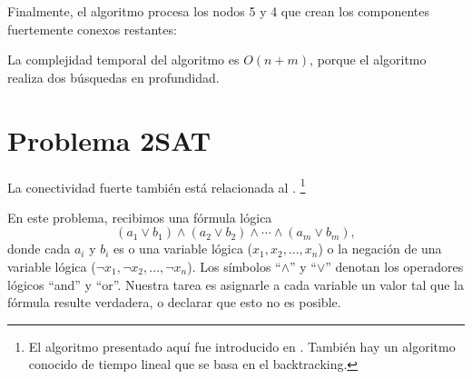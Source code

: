 Finalmente, el algoritmo procesa los nodos 5 y 4 que crean los
componentes fuertemente conexos restantes:
\begin{center}
\end{center}
La complejidad temporal del algoritmo es $O(n+m)$, porque el algoritmo
realiza dos búsquedas en profundidad.

\section{Problema 2SAT}

La conectividad fuerte también está relacionada al .
\footnote{El algoritmo presentado aquí fue introducido en \cite{asp79}.
    También hay un algoritmo conocido de tiempo lineal \cite{eve75}
    que se basa en el backtracking.}

En este problema, recibimos una fórmula lógica
\[
    (a_1 \lor b_1) \land (a_2 \lor b_2) \land \cdots \land (a_m \lor b_m),
\]
donde cada $a_i$ y $b_i$ es o una variable lógica
($x_1,x_2,\ldots,x_n$) o la negación de una variable lógica
($\lnot x_1, \lnot x_2, \ldots, \lnot x_n$).
Los símbolos ``$\land$'' y ``$\lor$'' denotan los operadores lógicos
``and'' y ``or''. Nuestra tarea es asignarle a cada variable un
valor tal que la fórmula resulte verdadera, o declarar que esto
no es posible.

